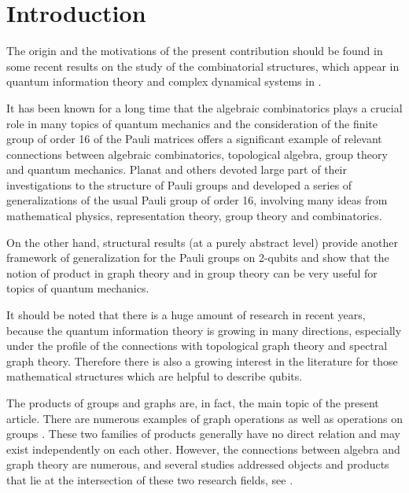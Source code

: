 \documentclass{amsart}
\theoremstyle{definition}
\numberwithin{equation}{section}
\begin{document}
\maketitle 



\tableofcontents

\section{Introduction}



The origin  and the motivations of the present contribution should be found in some recent results on the study of the combinatorial structures, which  appear in  quantum information theory and  complex dynamical systems in \cite{bbr1, b, bddr}. 


It has been known for a long time that the algebraic combinatorics plays a crucial role in many topics of quantum mechanics and the consideration of the finite group of order 16 of the Pauli  matrices offers a significant example of relevant connections between algebraic combinatorics, topological algebra, group theory and quantum mechanics.  Planat and others \cite{ps1, ps2} devoted large part of their investigations to the structure of Pauli groups and developed a series of generalizations of the usual Pauli group of order 16, involving many ideas from mathematical physics,  representation theory, group theory and combinatorics.  


On the other hand, structural results (at a purely abstract level) provide another framework of generalization for the Pauli groups on 2-qubits and \cite{bbr1, b, bddr} show that the notion of product in graph theory and in group theory can be very useful for topics of  quantum mechanics. 


It should be noted that there is a huge amount of  research in recent years, because the quantum information theory is growing in many directions, especially under the profile of the connections with topological graph theory and spectral graph theory.  Therefore there is also a growing interest in the literature for those mathematical structures which are helpful to describe qubits.

The products of groups and graphs are, in fact, the main topic of the present article. There are numerous examples of graph operations \cite{neps1, neps2, handbook, sab} as well as operations on groups \cite[Chapter A, \S 19, \S 20]{dh}. These two families of products generally have no direct relation and may exist independently on each other. However, the connections between algebra and graph theory are numerous, and several studies addressed objects and products that lie at the intersection of these two research fields, see \cite{bddr, belardo1,  godsil}.
\end{document}
